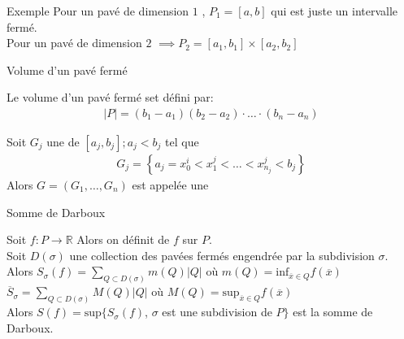 \begin{parag}{Exemple}
    Pour un pavé de dimension $1$ , $P_1 =  \left[a, b\right]$ qui est juste un intervalle fermé.\\
    Pour un pavé de dimension $2$ $\implies P_2 = \left[a_1, b_1\right] \times \left[a_2, b_2\right]$
\end{parag}
\begin{parag}{Volume d'un pavé fermé}
    \begin{definition}
        Le volume d'un pavé fermé set défini par:
        \begin{align*} \left|P\right| =  \left(b_1 - a_1\right)\left(b_2 - a_2\right) \cdot  \ldots \cdot  \left(b_n - a_n\right) \end{align*}
    \end{definition}
    
    \begin{definition}
        Soit $G_j$ une  de $\left[a_j, b_j\right]; a_j < b_j$ tel que
        \begin{align*} G_j =  \left\{a_j =  x_0^i < x_1^j < \ldots < x_{n_j}^j < b_j\right\} \end{align*}
        Alors $G = \left(G_1, \ldots, G_n\right)$ est appelée une 
    \end{definition}

\end{parag}
\begin{parag}{Somme de Darboux}
    \begin{definition}
        Soit $f: P \to \mathbb{R}$  Alors on définit  de $f$ sur $P$.\\
        Soit $D\left(\sigma\right)$ une collection des pavées fermés engendrée par la subdivision $\sigma$.\\
        Alors $S_{\sigma}\left(f\right) =  \sum_{Q \subset D\left(\sigma\right)}m\left(Q\right)\left|Q\right| $ où $m\left(Q\right) =  \text{inf}_{\overline{x}\in Q}f\left(\overline{x}\right)$\\
        $\overline{S}_{\sigma} =  \sum_{Q \subset D\left(\sigma\right)} M\left(Q\right) \left|Q\right| $ où $M\left(Q\right) =  \text{sup}_{\overline{x}\in Q}f\left(\overline{x}\right)$\\
        Alors $S\left(f\right) = \text{sup}\{S_{\sigma}\left(f\right)$, $\sigma$ est une subdivision de $P \}$ est la somme de Darboux.\\

    \end{definition}
\end{parag}
